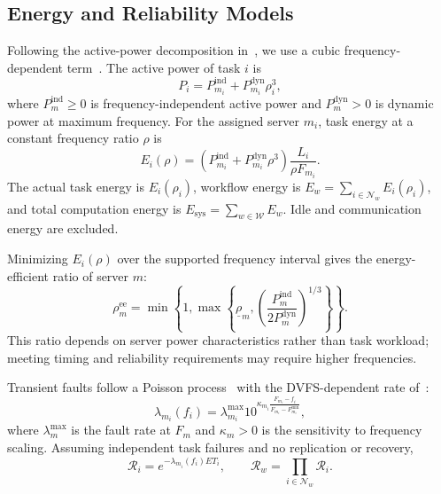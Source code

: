 \documentclass[journal]{IEEEtran}
\begin{document}
\subsection{Energy and Reliability Models}
\label{subsec:energy_model}
Following the active-power decomposition in~\cite{zhang2015reliability,zhu2009reliability}, we use a cubic frequency-dependent term~\cite{xie2017energy,zhu2006energy}. The active power of task $i$ is
\begin{equation*}
    P_i=P_{m_i}^{\mathrm{ind}}+P_{m_i}^{\mathrm{dyn}}\rho_i^3,
\end{equation*}
where $P_m^{\mathrm{ind}}\geq0$ is frequency-independent active power and $P_m^{\mathrm{dyn}}>0$ is dynamic power at maximum frequency. For the assigned server $m_i$, task energy at a constant frequency ratio $\rho$ is
\begin{equation*}
    E_i(\rho)=
    \left(P_{m_i}^{\mathrm{ind}}+P_{m_i}^{\mathrm{dyn}}\rho^3\right)
    \frac{L_i}{\rho F_{m_i}}.
\end{equation*}
The actual task energy is $E_i(\rho_i)$, workflow energy is $E_w=\sum_{i\in\mathcal N_w}E_i(\rho_i)$, and total computation energy is $E_{\mathrm{sys}}=\sum_{w\in\mathcal W}E_w$. Idle and communication energy are excluded.

Minimizing $E_i(\rho)$ over the supported frequency interval gives the energy-efficient ratio of server $m$:
\begin{equation}
    \rho_m^{\mathrm{ee}}=\min\!\left\{1,\max\!\left\{
    \underline\rho_m,
    \left(\frac{P_m^{\mathrm{ind}}}{2P_m^{\mathrm{dyn}}}\right)^{1/3}
    \right\}\right\}.
    \label{eq:rhoee}
\end{equation}
This ratio depends on server power characteristics rather than task workload; meeting timing and reliability requirements may require higher frequencies.

Transient faults follow a Poisson process~\cite{zhu2004} with the DVFS-dependent rate of~\cite{wu2018}:
\begin{equation*}
    \lambda_{m_i}(f_i)=\lambda_{m_i}^{\max}
    10^{\kappa_{m_i}
    \frac{F_{m_i}-f_i}{F_{m_i}-F_{m_i}^{\min}}},
\end{equation*}
where $\lambda_m^{\max}$ is the fault rate at $F_m$ and $\kappa_m>0$ is the sensitivity to frequency scaling. Assuming independent task failures and no replication or recovery,
\begin{equation}
    \mathcal R_i=e^{-\lambda_{m_i}(f_i)ET_i},
    \qquad \mathcal R_w=\prod_{i\in\mathcal N_w}\mathcal R_i.
    \label{eq:workflow_reliability}
\end{equation}
\end{document}
